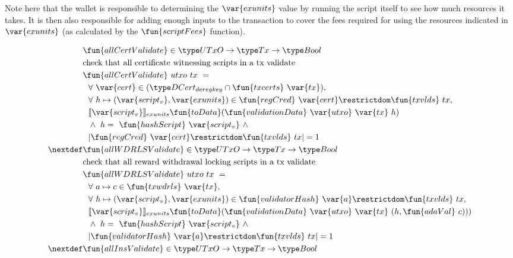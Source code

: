 Note here that the wallet is responsible to determining the $\var{exunits}$ value
by running the script itself to see how much resources it takes. It is then
also responsible for adding enough inputs to the transaction to cover the
fees required for using the resources indicated in $\var{exunits}$ (as
calculated by the $\fun{scriptFees}$ function).

\begin{figure}[htb]
  \begin{align*}
    & \fun{allCertValidate} \in \UTxO \to \Tx \to \Bool \\
    & \text{check that all certificate witnessing scripts in a tx validate} \\
    & \fun{allCertValidate}~{utxo}~{tx}~=~ \\
    & ~~\forall~\var{cert} \in
    (\DCertDeRegKey\cap\fun{txcerts}~\var{tx}), \\
    &~~\forall~h\mapsto (\var{script_v},\var{exunits})\in \fun{regCred}~\var{cert}\restrictdom\fun{txvlds}~{tx}, \\
    & ~~ \llbracket \var{script_v} \rrbracket_{exunits}
    \fun{toData}(\fun{validationData}~\var{utxo}~\var{tx}~h) \\
    & ~~ \wedge ~ h = ~\fun{hashScript}~\var{script_v}  ~\wedge~ \\
    & ~~  \vert \fun{regCred}~\var{cert}\restrictdom\fun{txvlds}~{tx} \vert = 1 \\
    \nextdef
    & \fun{allWDRLSValidate} \in \UTxO \to \Tx \to \Bool \\
    & \text{check that all reward withdrawal locking scripts in a tx validate} \\
    & \fun{allWDRLSValidate}~{utxo}~{tx}~=~ \\
    & ~~\forall~a \mapsto c \in\fun{txwdrls}~\var{tx}, \\
    & ~~ \forall~ h\mapsto (\var{script_v},\var{exunits})\in \fun{validatorHash}~\var{a}\restrictdom\fun{txvlds}~{tx}, \\
    & ~~ \llbracket \var{script_v} \rrbracket_{exunits}
    \fun{toData}(\fun{validationData}~\var{utxo}~\var{tx}~
      (h,\fun{adaVal}~c))) \\
    & ~~ \wedge ~ h = ~\fun{hashScript}~\var{script_v}  ~\wedge~ \\
    & ~~  \vert \fun{validatorHash}~\var{a}\restrictdom\fun{txvlds}~{tx} \vert = 1 \\
    \nextdef
    & \fun{allInsValidate} \in \UTxO \to \Tx \to \Bool \\

\end{align*}
\end{figure}
